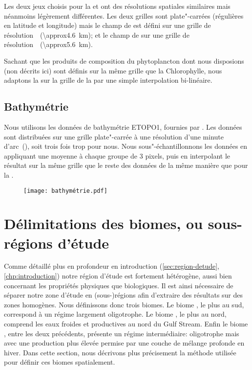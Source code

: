 Les deux jeux choisis pour la  et  ont des résolutions spatiales similaires mais néanmoins légèrement différentes.
Les deux grilles sont plate"-carrées (régulières en latitude et longitude) mais le champ de  est défini sur une grille  de résolution~~(\qty{\approx4.6}{\km}); et le champ de  sur une grille  de résolution~~(\qty{\approx5.6}{\km}).

Sachant que les produits de composition du phytoplancton dont nous disposions (non décrits ici) sont définis sur la même grille que la Chlorophylle, nous adaptons la  sur la grille de la  par une simple interpolation bi-linéaire.

\subsection{Bathymétrie}
\label{sec:donnees-bathymetrie}

Nous utilisons les données de bathymétrie ETOPO1, fournies par .
Les données sont distribuées sur une grille plate"-carrée à une résolution d'une minute d'arc~(), soit trois fois trop pour nous.
Nous sous"-échantillonnons les données en appliquant une moyenne à chaque groupe de 3 pixels, puis en interpolant le résultat sur la même grille que le reste des données de la même manière que pour la .

\begin{figure}
  \centering
  \texttt{[image: bathymétrie.pdf]}
  \label{fig:bathymetrie}
\end{figure}

\section{Délimitations des biomes, ou sous-régions d'étude}
\label{sec:delimitations-regions}

Comme détaillé plus en profondeur en introduction (\cref{sec:region-detude}, \cref*{chp:introduction}) notre région d'étude est fortement hétérogène, aussi bien concernant les propriétés physiques que biologiques.
Il est ainsi nécessaire de séparer notre zone d'étude en (sous-)régions afin d'extraire des résultats sur des zones homogènes.
Nous définissons donc trois biomes.
Le biome , le plus au sud, correspond à un régime largement oligotrophe.
Le biome , le plus au nord, comprend les eaux froides et productives au nord du Gulf Stream.
Enfin le biome , entre les deux précédents, présente un régime intermédiaire: oligotrophe mais avec une production plus élevée permise par une couche de mélange profonde en hiver.
Dans cette section, nous décrivons plus précisement la méthode utilisée pour définir ces biomes spatialement.


